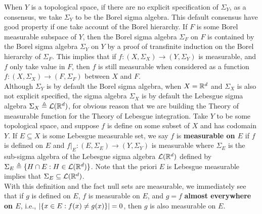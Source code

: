 \documentclass{report}
\begin{document}
\begin{mdframed}
When $Y$ is a topological space, if there are no explicit specification of $\Sigma_Y$, as a consensus, we take $\Sigma_Y$ to be the Borel sigma algebra. This default consensus have good property if one take account of the Borel hierarchy. If $F$ is some Borel measurable subspace of $Y$, then the Borel sigma algebra $\Sigma_F$ on $F$ is contained by the Borel sigma algebra $\Sigma_Y$ on $Y$ by a proof of transfinite induction on the Borel hierarchy of  $\Sigma_F$. This implies that if $f:(X,\Sigma_X)\rightarrow (Y,\Sigma_Y)$ is measurable, and $f$ only take value in $F$, then $f$ is still measurable when considered as a function $f:(X,\Sigma_X)\rightarrow (F,\Sigma_F)$ between $X$ and  $F$. \\

Although $\Sigma_Y$ is by default the Borel sigma algebra, when $X=\mathbb{R}^d$ and  $\Sigma_X$ is also not explicit specified, the sigma algebra $\Sigma_X$ is by default the Lebesgue sigma algebra $\Sigma_X\triangleq \mathcal{L}(\mathbb{R}^d)$, for obvious reason that we are building the Theory of measurable function for the Theory of Lebesgue integration. Take $Y$ to be some topological space, and suppose $f$ is define on some subset of $X$ and has codomain $Y$. If  $E\subseteq X$ is some Lebesgue measurable set, we say  $f$ is \textbf{measurable on $E$} if $f$ is defined on $E$ and  $f|_E:(E,\Sigma_E)\rightarrow (Y,\Sigma_Y)$ is measurable where $\Sigma_E$ is the sub-sigma algebra of the Lebesgue sigma algebra $\mathcal{L}(\mathbb{R}^d)$ defined by $\Sigma_E\triangleq \{ H\cap E:H \in \mathcal{L}(\mathbb{R}^d) \}$. Note that the priori $E$ is Lebesgue measurable implies that $\Sigma_E\subseteq \mathcal{L}(\mathbb{R}^d)$. \\



With this definition and the fact null sets are measurable, we immediately see that if  $g $ is defined on $E$, $f$ is measurable on  $E$, and  $g=f$ \textbf{almost everywhere on $E$}, i.e., $\left|\{ x\in E:f(x)\neq g(x) \}\right|=0$, then $g$ is also measurable on $E$. \\





\end{mdframed}
\end{document}
